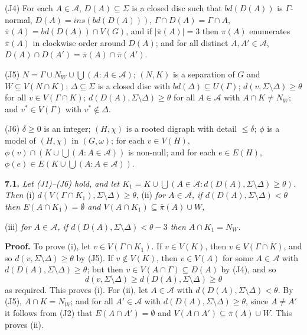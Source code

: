 \hspace*{12pt}(J4) For each $A \in \mathcal{A}$, $D(A) \subseteq \Sigma$ is a closed disc such that $bd(D(A))$ is $\Gamma$-normal, $D(A) = ins(bd(D(A)))$, $\Gamma \cap D(A) = \Gamma \cap A$, $\bar{\pi}(A) = bd(D(A)) \cap V(G)$, and if $|\bar{\pi}(A)| = 3$ then $\pi(A)$ enumerates $\bar{\pi}(A)$ in clockwise order around $D(A)$; and for all distinct $A, A' \in \mathcal{A}$, $D(A) \cap D(A') = \bar{\pi}(A) \cap \bar{\pi}(A')$.

\hspace*{12pt}(J5) $N = \Gamma \cup N_W \cup \bigcup(A : A \in \mathcal{A})$; $(N, K)$ is a separation of $G$ and $W \subseteq V(N \cap K)$; $\Delta \subseteq \Sigma$ is a closed disc with $bd(\Delta) \subseteq U(\Gamma)$; $d(v, \Sigma \setminus \Delta) \ge \theta$ for all $v \in V(\Gamma \cap K)$; $d(D(A), \Sigma \setminus \Delta) \ge \theta$ for all $A \in \mathcal{A}$ with $A \cap K \ne N_W$; and $v^* \in V(\Gamma)$ with $v^* \notin \Delta$.

\hspace*{12pt}(J6) $\delta \ge 0$ is an integer; $(H, \chi)$ is a rooted digraph with detail $\le \delta$; $\phi$ is a model of $(H, \chi)$ in $(G, \omega)$; for each $v \in V(H)$, $\phi(v) \cap (K \cup \bigcup(A : A \in \mathcal{A}))$ is non-null; and for each $e \in E(H)$, $\phi(e) \in E(K \cup \bigcup(A : A \in \mathcal{A}))$.

\textbf{7.1.} \textit{Let (J1)--(J6) hold, and let $K_1 = K \cup \bigcup(A \in \mathcal{A} : d(D(A), \Sigma \setminus \Delta) \ge \theta)$. Then} (i) $d(V(\Gamma \cap K_1), \Sigma \setminus \Delta) \ge \theta$, (ii) \textit{for $A \in \mathcal{A}$, if $d(D(A), \Sigma \setminus \Delta) < \theta$ then $E(A \cap K_1) = \emptyset$ and $V(A \cap K_1) \subseteq \bar{\pi}(A) \cup W$,}

\hspace*{12pt}(iii) \textit{for $A \in \mathcal{A}$, if $d(D(A), \Sigma \setminus \Delta) < \theta - 3$ then $A \cap K_1 = N_W$.}

\textbf{Proof.} To prove (i), let $v \in V(\Gamma \cap K_1)$. If $v \in V(K)$, then $v \in V(\Gamma \cap K)$, and so $d(v, \Sigma \setminus \Delta) \ge \theta$ by (J5). If $v \notin V(K)$, then $v \in V(A)$ for some $A \in \mathcal{A}$ with $d(D(A), \Sigma \setminus \Delta) \ge \theta$; but then $v \in V(A \cap \Gamma) \subseteq D(A)$ by (J4), and so
\begin{equation*}
d(v, \Sigma \setminus \Delta) \ge d(D(A), \Sigma \setminus \Delta) \ge \theta
\end{equation*}
as required. This proves (i). For (ii), let $A \in \mathcal{A}$ with $d(D(A), \Sigma \setminus \Delta) < \theta$. By (J5), $A \cap K = N_W$; and for all $A' \in \mathcal{A}$ with $d(D(A), \Sigma \setminus \Delta) \ge \theta$, since $A \ne A'$ it follows from (J2) that $E(A \cap A') = \emptyset$ and $V(A \cap A') \subseteq \bar{\pi}(A) \cup W$. This proves (ii).

